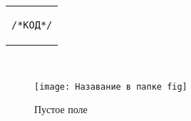 \begin{tabular}{c}
    \setlength{\parindent}{2cm}

    \begin{lstlisting}[language=/*ЯЗЫК*/]
    /*КОД*/\end{lstlisting}
\end{tabular}\\



\begin{figure}[!h]
    \centering
    \texttt{[image: Назавание в папке fig]}
    \caption{Пустое поле} %
    \label{fig:emptyField} %
\end{figure}